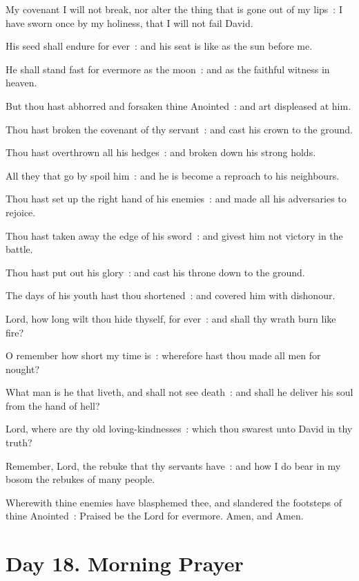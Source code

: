 My covenant I will not break, nor alter the thing that is gone out of my lips~: I have sworn once by my holiness, that I will not fail David.\par
{}His seed shall endure for ever~: and his seat is like as the sun before me.\par
{}He shall stand fast for evermore as the moon~: and as the faithful witness in heaven.\par
{}But thou hast abhorred and forsaken thine Anointed~: and art displeased at him.\par
{}Thou hast broken the covenant of thy servant~: and cast his crown to the ground.\par
{}Thou hast overthrown all his hedges~: and broken down his strong holds.\par
{}All they that go by spoil him~: and he is become a reproach to his neighbours.\par
{}Thou hast set up the right hand of his enemies~: and made all his adversaries to rejoice.\par
{}Thou hast taken away the edge of his sword~: and givest him not victory in the battle.\par
{}Thou hast put out his glory~: and cast his throne down to the ground.\par
{}The days of his youth hast thou shortened~: and covered him with dishonour.\par
{}Lord, how long wilt thou hide thyself, for ever~: and shall thy wrath burn like fire?\par
{}O remember how short my time is~: wherefore hast thou made all men for nought?\par
{}What man is he that liveth, and shall not see death~: and shall he deliver his soul from the hand of hell?\par
{}Lord, where are thy old loving-kindnesses~: which thou swarest unto David in thy truth?\par
{}Remember, Lord, the rebuke that thy servants have~: and how I do bear in my bosom the rebukes of many people.\par
{}Wherewith thine enemies have blasphemed thee, and slandered the footsteps of thine Anointed~: Praised be the Lord for evermore. Amen, and Amen.\par

\section*{Day 18. Morning Prayer}

